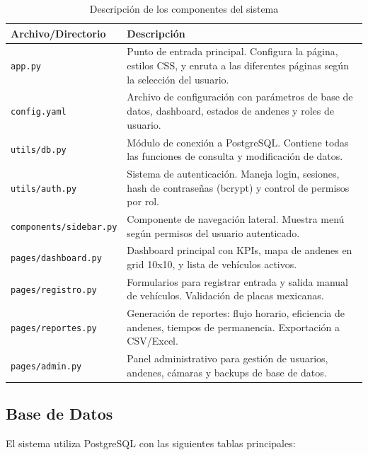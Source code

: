\documentclass[12pt,a4paper]{article}
\begin{document}
\begin{table}[H]
    \centering
    \begin{tabularx}{\textwidth}{|l|X|}
        \hline
        \textbf{Archivo/Directorio} & \textbf{Descripción} \\
        \hline
        \texttt{app.py} & Punto de entrada principal. Configura la página, estilos CSS, y enruta a las diferentes páginas según la selección del usuario. \\
        \hline
        \texttt{config.yaml} & Archivo de configuración con parámetros de base de datos, dashboard, estados de andenes y roles de usuario. \\
        \hline
        \texttt{utils/db.py} & Módulo de conexión a PostgreSQL. Contiene todas las funciones de consulta y modificación de datos. \\
        \hline
        \texttt{utils/auth.py} & Sistema de autenticación. Maneja login, sesiones, hash de contraseñas (bcrypt) y control de permisos por rol. \\
        \hline
        \texttt{components/sidebar.py} & Componente de navegación lateral. Muestra menú según permisos del usuario autenticado. \\
        \hline
        \texttt{pages/dashboard.py} & Dashboard principal con KPIs, mapa de andenes en grid 10x10, y lista de vehículos activos. \\
        \hline
        \texttt{pages/registro.py} & Formularios para registrar entrada y salida manual de vehículos. Validación de placas mexicanas. \\
        \hline
        \texttt{pages/reportes.py} & Generación de reportes: flujo horario, eficiencia de andenes, tiempos de permanencia. Exportación a CSV/Excel. \\
        \hline
        \texttt{pages/admin.py} & Panel administrativo para gestión de usuarios, andenes, cámaras y backups de base de datos. \\
        \hline
    \end{tabularx}
    \caption{Descripción de los componentes del sistema}
\end{table}

\subsection{Base de Datos}

El sistema utiliza PostgreSQL con las siguientes tablas principales:
\end{document}
